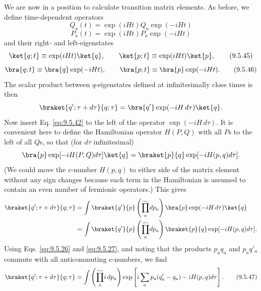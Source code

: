 We are now in a position to calculate transition matrix elements. As before,
we define time-dependent operators
\begin{equation}
Q_a(t)=\exp(iHt)Q_a\exp(-iHt)
\tag{9.5.43}\label{eq:9.5.43}
\end{equation}
\begin{equation}
P_a(t)=\exp(iHt)P_a\exp(-iHt)
\tag{9.5.44}\label{eq:9.5.44}
\end{equation}
and their right- and left-eigenstates
\begin{equation}
\ket{q;t}\equiv\exp(iHt)\ket{q},
\qquad
\ket{p;t}\equiv\exp(iHt)\ket{p},
\tag{9.5.45}\label{eq:9.5.45}
\end{equation}
\begin{equation}
\bra{q;t}\equiv\bra{q}\exp(-iHt),
\qquad
\bra{p;t}\equiv\bra{p}\exp(-iHt).
\tag{9.5.46}\label{eq:9.5.46}
\end{equation}
The scalar product between $q$-eigenstates defined at infinitesimally close
times is then
\[
\braket{q';\tau+d\tau}{q;\tau}
=\bra{q'}\exp(-iH\,d\tau)\ket{q}.
\]
Now insert Eq. \eqref{eq:9.5.42} to the left of the operator $\exp(-iH\,d\tau)$. It is
convenient here to define the Hamiltonian operator $H(P,Q)$ with all $P$s to
the left of all $Q$s, so that (for $d\tau$ infinitesimal)
\[
\bra{p}\exp[-iH(P,Q)d\tau]\ket{q}
=\braket{p}{q}\exp[-iH(p,q)d\tau].
\]
(We could move the c-number $H(p,q)$ to either side of the matrix element
without any sign changes because each term in the Hamiltonian is assumed to
contain an even number of fermionic operators.) This gives
\begin{align*}
\braket{q';\tau+d\tau}{q;\tau}
&=\int\braket{q'}{p}
 \left(\widetilde{\prod_a}dp_a\right)
 \bra{p}\exp(-iH\,d\tau)\ket{q}\\
&=\int\braket{q'}{p}
 \left(\widetilde{\prod_a}dp_a\right)\braket{p}{q}
 \exp[-iH(p,q)d\tau].
\end{align*}
Using Eqs. \eqref{eq:9.5.26} and \eqref{eq:9.5.27}, and noting that the products $p_aq_a$ and
$p_aq'_a$ commute with all anticommuting c-numbers, we find
\begin{equation}
\braket{q';\tau+d\tau}{q;\tau}
=\int\left(\widetilde{\prod_a}i\,dp_a\right)
 \exp\left[i\sum_ap_a(q'_a-q_a)-iH(p,q)d\tau\right].
\tag{9.5.47}\label{eq:9.5.47}
\end{equation}


